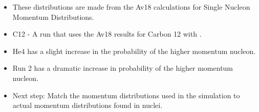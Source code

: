 \documentclass[landscape,a0paper,fontscale=0.285]{baposter} %
\newcommand{\compresslist}{ %
\setlength{\itemsep}{1pt}
\setlength{\parskip}{0pt}
\setlength{\parsep}{0pt}
}
\begin{document}
\begin{poster}
{\vspace{-1.1em}
\begin{itemize}[leftmargin=*]\compresslist

\item These distributions are made from the Av18 calculations for Single Nucleon Momentum Distributions\cite{av18,av18_2}.
\item C12 - A run that uses the Av18 results for Carbon 12 with .    
\item He4 has a slight increase in the probability of the  higher momentum nucleon.
\item Run 2 has a dramatic increase in probability of the  higher momentum nucleon. 
\item Next step: Match the momentum distributions used in the simulation to actual momentum distributions found in nuclei.   
 
\end{itemize}
}



\end{poster}
\end{document}
